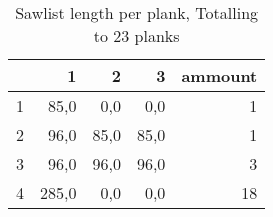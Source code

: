 \begin{table}[h!]
\centering
\caption{Sawlist length per plank, Totalling to 23 planks}
\begin{tabular}{lrrrr}
\toprule
{} &     1 &    2 &    3 &  ammount \\
\midrule
1 &  85,0 &  0,0 &  0,0 &        1 \\
2 &  96,0 & 85,0 & 85,0 &        1 \\
3 &  96,0 & 96,0 & 96,0 &        3 \\
4 & 285,0 &  0,0 &  0,0 &       18 \\
\bottomrule
\end{tabular}
\end{table}
